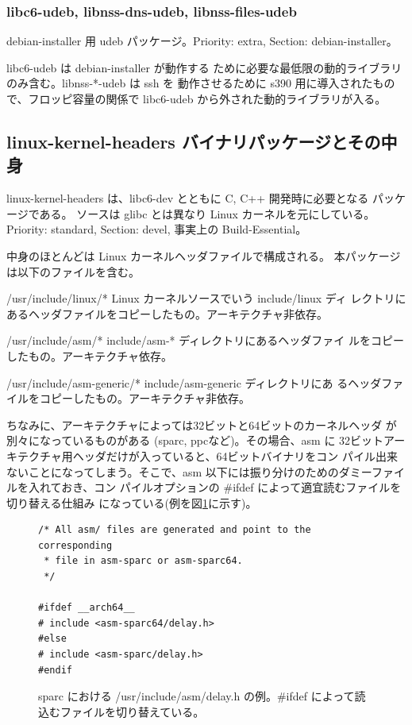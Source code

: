 \documentclass[mingoth,a4paper]{jsarticle}
\newenvironment{gdescription}%
{%
   \begin{list}{}%
   {%
      \setlength{\itemindent}{0mm}
      \setlength{\leftmargin}{45mm}%
      \setlength{\rightmargin}{0zw}%
      \setlength{\labelsep}{4mm}%
      \setlength{\labelwidth}{4cm}%
      \setlength{\itemsep}{0em}%
      \setlength{\parsep}{0cm}%
      \setlength{\listparindent}{0cm}%
      \let\makelabel\gdescriptionlabel
   }
}{%
   \end{list}%
}
\newcommand*\gdescriptionlabel[1]{\hspace\labelsep\normalfont\bfseries #1}
\begin{document}
  \subsubsection{libc6-udeb, libnss-dns-udeb, libnss-files-udeb}

    debian-installer 用 udeb パッケージ。Priority: extra, Section:
    debian-installer。

    libc6-udeb は debian-installer が動作する
    ために必要な最低限の動的ライブラリのみ含む。libnss-*-udeb は ssh を
    動作させるために s390 用に導入されたもので、フロッピ容量の関係で
    libc6-udeb から外された動的ライブラリが入る。

\subsection{linux-kernel-headers バイナリパッケージとその中身}

  linux-kernel-headers は、libc6-dev とともに C, C++ 開発時に必要となる
  パッケージである。
  ソースは glibc とは異なり Linux カーネルを元にしている。Priority:
  standard, Section: devel, 事実上の Build-Essential。

  中身のほとんどは Linux カーネルヘッダファイルで構成される。
  本パッケージは以下のファイルを含む。

  \begin{gdescription}
    \item[/usr/include/linux/*] Linux カーネルソースでいう include/linux ディ
	       レクトリにあるヘッダファイルをコピーしたもの。アーキテクチャ非依存。
    \item[/usr/include/asm/*] include/asm-* ディレクトリにあるヘッダファイ
	       ルをコピーしたもの。アーキテクチャ依存。
    \item[/usr/include/asm-generic/*] include/asm-generic ディレクトリにあ
	       るヘッダファイルをコピーしたもの。アーキテクチャ非依存。
  \end{gdescription}

  ちなみに、アーキテクチャによっては32ビットと64ビットのカーネルヘッダ
  が別々になっているものがある (sparc, ppcなど)。その場合、asm に
  32ビットアーキテクチャ用ヘッダだけが入っていると、64ビットバイナリをコン
  パイル出来ないことになってしまう。そこで、asm 以下には振り分けのためのダミーファイルを入れておき、コン
  パイルオプションの \#ifdef によって適宜読むファイルを切り替える仕組み
  になっている(例を図\ref{asm-sparc}に示す)。

\begin{figure}
\begin{Verbatim}[frame=single]
/* All asm/ files are generated and point to the corresponding
 * file in asm-sparc or asm-sparc64.
 */

#ifdef __arch64__
# include <asm-sparc64/delay.h>
#else
# include <asm-sparc/delay.h>
#endif
\end{Verbatim}
\caption{sparc における /usr/include/asm/delay.h の例。\#ifdef によって読込むファイルを切り替えている。}
\label{asm-sparc}
\end{figure}
\end{document}
